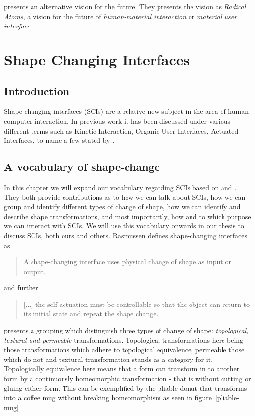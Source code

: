 \cite{ishii2012radical} presents an alternative vision for the future.
They presents the vision as \textit{Radical Atoms}, a vision for the future of \textit{human-material interaction} or \textit{material user interface}. 
\section{Shape Changing Interfaces}
\subsection{Introduction}
Shape-changing interfaces (SCIs) are a relative new subject in the area of human-computer interaction.
In previous work it has been discussed under various different terms such as Kinetic Interaction, Organic User Interfaces, Actuated Interfaces, to name a few stated by \cite{rasmussen2012shape}.

\subsection{A vocabulary of shape-change}
In this chapter we will expand our vocabulary regarding SCIs based on \cite{coelho2011shape} and \cite{rasmussen2012shape}.
They both provide contributions as to how we can talk about SCIs, how we can group and identify different types of change of shape, how we can identify and describe shape transformations, and most importantly, how and to which purpose we can interact with SCIs.
We will use this vocabulary onwards in our thesis to discuss SCIs, both ours and others.   
Rasmussen defines shape-changing interfaces as
\begin{quotation}
A shape-changing interface uses physical change of shape as input or output.
\end{quotation}
and further
\begin{quotation}
[...] the self-actuation must be controllable so that the object can return to its initial state and repeat the shape change.
\end{quotation}

\cite{coelho2011shape} presents a grouping which distinguish three types of change of shape: \emph{topological, textural and permeable} transformations.
Topological transformations here being those transformations which adhere to topological equivalence, permeable those which do not and textural transformation stands as a category for it. Topologically equivalence here means that a form can transform in to another form by a continuously homeomorphic transformation - that is without cutting or gluing either form. This can be exemplified by the pliable donut that transforms into a coffee mug without breaking homeomorphism as seen in figure~\ref{pliable-mug}  

